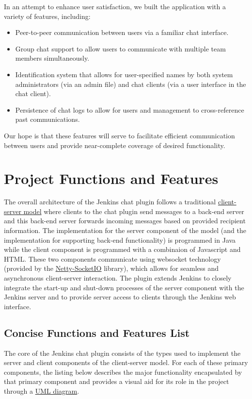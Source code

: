 \documentclass{article}
\begin{document}
		In an attempt to enhance user satisfaction, we built the application with
		a variety of features, including:

		\begin{itemize}
			\item Peer-to-peer communication between users via a familiar chat
			interface.
			\item Group chat support to allow users to communicate with multiple
			team members simultaneously.
			\item Identification system that allows for user-specified names by
			both system administrators (via an admin file) and chat clients
			(via a user interface in the chat client).
			\item Persistence of chat logs to allow for users and management to 
			cross-reference past communications.
		\end{itemize}
		
		Our hope is that these features will serve to facilitate efficient
		communication between users and provide near-complete coverage of desired
		functionality.


	\section[Functions and Features]{Project Functions and Features}
	The overall architecture of the Jenkins chat plugin follows a traditional
	\href{http://en.wikipedia.org/wiki/Client\%E2\%80\%93server\textunderscore model}{client-server model} 
	where clients to the chat plugin send messages to
	a back-end server and this back-end server forwards incoming messages 
	based on provided recipient information.  The implementation for the server 
	component of the model (and the implementation for supporting back-end
	functionality) is programmed in Java while the client component is
	programmed with a combinaion of Javascript and HTML.  These two components
	communicate using websocket technology (provided by the 
	\href{https://github.com/mrniko/netty-socketio/releases}{Netty-SocketIO} library), 
	which allows for seamless and asynchronous client-server interaction.
	The plugin extends Jenkins to closely integrate the start-up and shut-down
	processes of the server component with the Jenkins server and to provide
	server access to clients through the Jenkins web interface.

		\subsection[Feature List]{Concise Functions and Features List}
		The core of the Jenkins chat plugin consists of the types used to
		implement the server and client components of the client-server model.
		For each of these primary components, the listing below describes the
		major functionality encapsulated by that primary component and provides
		a visual aid for its role in the project through a 
		\href{http://www.csci.csusb.edu/dick/samples/uml0.html}{UML diagram}.
\end{document}
